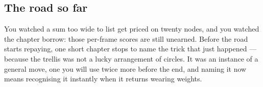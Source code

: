 \cleardoublepage
\begin{narrative}
\section*{The road so far}


\noindent You watched a sum too wide to list get priced on twenty nodes, and you watched the chapter borrow: those per-frame scores are still unearned. Before the road starts repaying, one short chapter stops to name the trick that just happened — because the trellis was not a lucky arrangement of circles. It was an instance of a general move, one you will use twice more before the end, and naming it now means recognising it instantly when it returns wearing weights.
\end{narrative}

